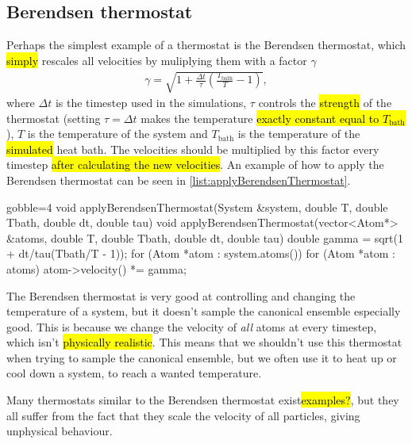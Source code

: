 \subsection{Berendsen thermostat}
Perhaps the simplest example of a thermostat is the Berendsen thermostat\cite{berendsen1984molecular}, which \hl{simply} rescales all velocities by muliplying them with a factor $\gamma$
\begin{align*}
    \gamma = \sqrt{1 + \frac{\Delta t}{\tau}\left(\frac{T_\text{bath}}{T} - 1\right)},
\end{align*}
where $\Delta t$ is the timestep used in the simulations, $\tau$ controls the \hl{strength} of the thermostat (setting $\tau = \Delta t$ makes the temperature \hl{exactly constant equal to $T_\text{bath}$}), $T$ is the temperature of the system and $T_\text{bath}$ is the temperature of the \hl{simulated} heat bath. The velocities should be multiplied by this factor every timestep \hl{after calculating the new velocities}. An example of how to apply the Berendsen thermostat can be seen in \cref{list:applyBerendsenThermostat}.
%
\begin{listing}[!htb]%
\begin{cppcode*}{gobble=4}
    void applyBerendsenThermostat(System &system, double T, double Tbath, 
        double dt, double tau)
    void applyBerendsenThermostat(vector<Atom*> &atoms, double T, double Tbath, 
        double dt, double tau)
    {
        double gamma = sqrt(1 + dt/tau(Tbath/T - 1));
        for (Atom *atom : system.atoms())
        for (Atom *atom : atoms)
        {
            atom->velocity() *= gamma;
        }
    }
\end{cppcode*}
\caption{%
    \texttt{applyBerendsenThermostat}. \hl{decide on System or vector<Atom*> as input}%
    \label{list:applyBerendsenThermostat}%
}%
\end{listing}%

The Berendsen thermostat is very good at controlling and changing the temperature of a system, but it doesn't sample the canonical ensemble especially good. This is because we change the velocity of \emph{all} atoms at every timestep, which isn't \hl{physically realistic}. This means that we shouldn't use this thermostat when trying to sample the canonical ensemble, but we often use it to heat up or cool down a system, to reach a wanted temperature.

Many thermostats similar to the Berendsen thermostat exist\hl{examples?}, but they all suffer from the fact that they scale the velocity of all particles, giving unphysical behaviour.

